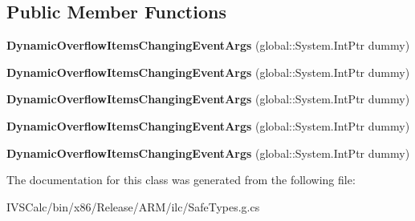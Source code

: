 \subsection*{Public Member Functions}
\begin{DoxyCompactItemize}
\item 
\mbox{\label{class_windows_1_1_u_i_1_1_xaml_1_1_controls_1_1_dynamic_overflow_items_changing_event_args_a5099149352faee4b45c3c5e8931beff5}} 
{\bfseries Dynamic\+Overflow\+Items\+Changing\+Event\+Args} (global\+::\+System.\+Int\+Ptr dummy)
\item 
\mbox{\label{class_windows_1_1_u_i_1_1_xaml_1_1_controls_1_1_dynamic_overflow_items_changing_event_args_a5099149352faee4b45c3c5e8931beff5}} 
{\bfseries Dynamic\+Overflow\+Items\+Changing\+Event\+Args} (global\+::\+System.\+Int\+Ptr dummy)
\item 
\mbox{\label{class_windows_1_1_u_i_1_1_xaml_1_1_controls_1_1_dynamic_overflow_items_changing_event_args_a5099149352faee4b45c3c5e8931beff5}} 
{\bfseries Dynamic\+Overflow\+Items\+Changing\+Event\+Args} (global\+::\+System.\+Int\+Ptr dummy)
\item 
\mbox{\label{class_windows_1_1_u_i_1_1_xaml_1_1_controls_1_1_dynamic_overflow_items_changing_event_args_a5099149352faee4b45c3c5e8931beff5}} 
{\bfseries Dynamic\+Overflow\+Items\+Changing\+Event\+Args} (global\+::\+System.\+Int\+Ptr dummy)
\item 
\mbox{\label{class_windows_1_1_u_i_1_1_xaml_1_1_controls_1_1_dynamic_overflow_items_changing_event_args_a5099149352faee4b45c3c5e8931beff5}} 
{\bfseries Dynamic\+Overflow\+Items\+Changing\+Event\+Args} (global\+::\+System.\+Int\+Ptr dummy)
\end{DoxyCompactItemize}


The documentation for this class was generated from the following file\+:\begin{DoxyCompactItemize}
\item 
I\+V\+S\+Calc/bin/x86/\+Release/\+A\+R\+M/ilc/Safe\+Types.\+g.\+cs\end{DoxyCompactItemize}

